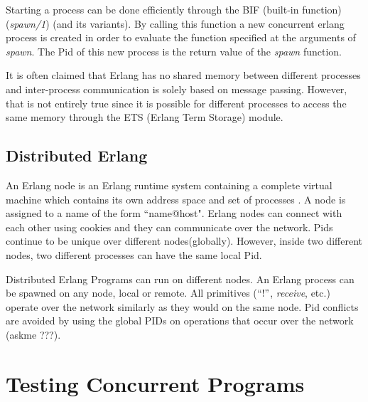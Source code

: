 Starting a process can be done efficiently through the BIF (built-in function) (\textit{spawn/1})
(and its variants).
By calling this function a new concurrent erlang process is created in order to evaluate the function
specified at the arguments of \textit{spawn}. The Pid of this new process is the return value of the \textit{spawn}
function.

It is often claimed that Erlang has no shared memory between different processes \cite{Armstrong:2007:PES:1403889}
and inter-process communication is solely based on
message passing. However, that is not entirely true since it is possible for different processes to
access the same memory through the ETS (Erlang Term Storage) module.

\subsection{Distributed Erlang}

An Erlang node is an Erlang runtime system containing a complete virtual machine which contains its
own address space and set of processes \cite{Armstrong:2007:PES:1403889}. A node is assigned to a name of
the form ``name@host". Erlang nodes can connect with each other using cookies and they can communicate
over the network. Pids continue to be unique over different nodes(globally). However, inside
two different nodes, two different processes can have the same local Pid.

Distributed Erlang Programs can run on different nodes. An Erlang process can be spawned on any 
node, local or remote. All primitives ($``!"$, \textit{receive}, etc.) operate over the network similarly as they
would on the same node. Pid conflicts are avoided by using the global PIDs on operations
that occur over the network (askme ???).

\section{Testing Concurrent Programs}

